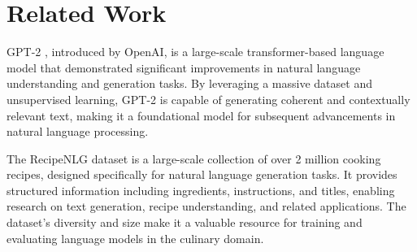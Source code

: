 \section{Related Work}

GPT-2 \cite{radford2019language}, introduced by OpenAI, is a large-scale transformer-based language model that demonstrated significant improvements in natural language understanding and generation tasks. By leveraging a massive dataset and unsupervised learning, GPT-2 is capable of generating coherent and contextually relevant text, making it a foundational model for subsequent advancements in natural language processing.

The RecipeNLG dataset \cite{bien2020recipenlg} is a large-scale collection of over 2 million cooking recipes, designed specifically for natural language generation tasks. It provides structured information including ingredients, instructions, and titles, enabling research on text generation, recipe understanding, and related applications. The dataset's diversity and size make it a valuable resource for training and evaluating language models in the culinary domain.
